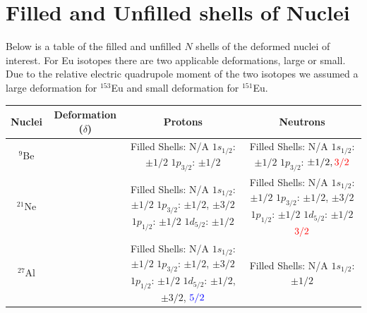 \documentclass[10pt,a4paper, twoside]{report}
\begin{document}
\section{Filled and Unfilled shells of Nuclei}
Below is a table of the filled and unfilled $N$ shells of the deformed nuclei of interest. For Eu isotopes there are two applicable deformations, large or small. Due to the relative electric quadrupole moment of the two isotopes we assumed a large deformation for $^{153}$Eu and small deformation for $^{151}$Eu.
\begin{table}[htbp]
\begin{adjustwidth}{-3cm}{-3cm}
\centering
\begin{tabular}{|c|c|c|c|}
\toprule
\toprule
Nuclei     & Deformation ($\delta$) & Protons & Neutrons \\
\midrule
$^{9}$Be   &                        
    &  \pbox{20cm}{Filled Shells: N/A \\
    $1s_{1/2}$: $\pm 1/2$ \\
    $1p_{3/2}$: $\pm 1/2$}              
    &  \pbox{20cm}{Filled Shells: N/A \\
    $1s_{1/2}$: $\pm 1/2$ \\
    $1p_{3/2}$: $\pm 1/2, \textcolor{red}{3/2}$}\\
\midrule
$^{21}$Ne  &       
    &  \pbox{20cm}{Filled Shells: N/A \\
    $1s_{1/2}$: $\pm 1/2$ \\
    $1p_{3/2}$: $\pm 1/2$, $\pm 3/2$ \\
    $1p_{1/2}$: $\pm 1/2$ \\
    $1d_{5/2}$: $\pm 1/2$}              
    &  \pbox{20cm}{Filled Shells: N/A \\
    $1s_{1/2}$: $\pm 1/2$ \\
    $1p_{3/2}$: $\pm 1/2$, $\pm 3/2$ \\
    $1p_{1/2}$: $\pm 1/2$ \\
    $1d_{5/2}$: $\pm 1/2$ $\textcolor{red}{3/2}$}\\
\midrule
$^{27}$Al  &       
    &  \pbox{20cm}{Filled Shells: N/A \\
    $1s_{1/2}$: $\pm 1/2$ \\
    $1p_{3/2}$: $\pm 1/2$, $\pm 3/2$ \\
    $1p_{1/2}$: $\pm 1/2$ \\
    $1d_{5/2}$: $\pm 1/2$, $\pm 3/2$, $\textcolor{blue}{5/2}$}              
    &  \pbox{20cm}{Filled Shells: N/A \\
    $1s_{1/2}$: $\pm 1/2$ \\
}
\end{tabular}
\end{adjustwidth}
\end{table}
\end{document}
